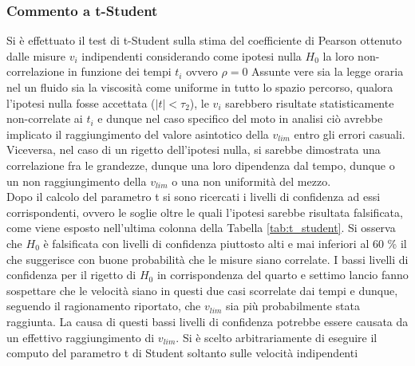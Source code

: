 \documentclass[a4paper,11pt,oneside]{article}
\begin{document}
\subsubsection*{Commento a t-Student} %
Si è effettuato il test di t-Student sulla stima del coefficiente di Pearson ottenuto dalle misure $v_{i}$ indipendenti considerando come ipotesi nulla $H_{0}$ la loro non-correlazione in funzione dei tempi $t_{i}$ ovvero $\rho=0$
Assunte vere sia la legge oraria nel un fluido sia la viscosità come uniforme in tutto lo spazio percorso, qualora l'ipotesi nulla fosse accettata ($|t| < \tau_{2}$), le $v_{i}$ sarebbero risultate statisticamente non-correlate ai $t_{i}$ e dunque nel caso specifico del moto in analisi ciò avrebbe implicato il raggiungimento del valore asintotico della $v_{lim}$ entro gli errori casuali. Viceversa, nel caso di un rigetto dell'ipotesi nulla, si sarebbe dimostrata una correlazione fra le grandezze, dunque una loro dipendenza dal tempo, dunque o un non raggiungimento della $v_{lim}$ o una non uniformità del mezzo.\\
Dopo il calcolo del parametro t si sono ricercati i livelli di confidenza ad essi corrispondenti, ovvero le soglie oltre le quali l'ipotesi sarebbe risultata falsificata, come viene esposto nell'ultima colonna della Tabella \ref{tab:t_student}.
Si osserva che $H_{0}$ è falsificata con livelli di confidenza piuttosto alti e mai inferiori al 60 \% il che suggerisce con buone probabilità che le misure siano correlate.\newline
I bassi livelli di confidenza per il rigetto di $H_{0}$ in corrispondenza del quarto e settimo lancio fanno sospettare che le velocità siano in questi due casi scorrelate dai tempi e dunque, seguendo il ragionamento riportato, che $v_{lim}$ sia più probabilmente stata raggiunta. La causa di questi bassi livelli di confidenza potrebbe essere causata da un effettivo raggiungimento di $v_{lim}$.\newline
Si è scelto arbitrariamente di eseguire il computo del parametro t di Student soltanto sulle velocità indipendenti %
\end{document}
